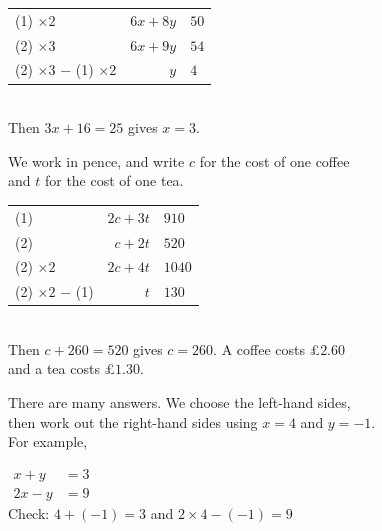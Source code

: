 \documentclass[aspectratio=169]{beamer}
\makeatletter
\newcommand{\by}[1]{{\normalsize #1}}
\newcommand{\simwork}[1]{%
  \begin{tabular}{@{}l@{\qquad}r@{${}={}$}l@{}}#1\end{tabular}%
}
\makeatother
\begin{document}
  {\simwork{\by{(1) $\times 2$} & $6x+8y$ & $50$\\
            \by{(2) $\times 3$} & $6x+9y$ & $54$\\
            \by{(2) $\times 3$ $-$ (1) $\times 2$} & $y$ & $4$}\\[0.3em]
   Then $3x+16=25$ gives $x=3$.}

  {We work in pence, and write $c$ for the cost of one coffee\\
   and $t$ for the cost of one tea.
   \par\vspace{0.3em}
   \simwork{\by{(1)} & $2c+3t$ & $910$\\
            \by{(2)} & $c+2t$ & $520$\\
            \by{(2) $\times 2$} & $2c+4t$ & $1040$\\
            \by{(2) $\times 2$ $-$ (1)} & $t$ & $130$}\\[0.3em]
   Then $c+260=520$ gives $c=260$. A coffee costs \pounds$2.60$\\
   and a tea costs \pounds$1.30$.}

  {There are many answers. We choose the left-hand sides,\\
   then work out the right-hand sides using $x=4$ and $y=-1$.\\
   For example,
   \par\vspace{0.3em}
   $\begin{aligned} x+y&=3\\ 2x-y&=9 \end{aligned}$\\[0.4em]
   Check: $4+(-1)=3$ and $2\times 4-(-1)=9$}
\end{document}
